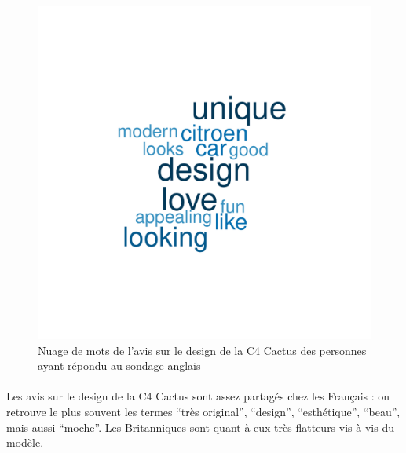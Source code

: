 \documentclass[12pt]{article}\usepackage[]{graphicx}\usepackage[]{color}
\makeatletter
\def\maxwidth{ %
  \ifdim\Gin@nat@width>\linewidth
    \linewidth
  \else
    \Gin@nat@width
  \fi
}
\newenvironment{knitrout}{}{} %
\makeatother
\begin{document}
\begin{knitrout}
\color{fgcolor}\begin{figure}[H]
\includegraphics[width=\maxwidth]{figure/design_en-1} \caption[Nuage de mots de l'avis sur le design de la C4 Cactus des personnes ayant répondu au sondage anglais]{Nuage de mots de l'avis sur le design de la C4 Cactus des personnes ayant répondu au sondage anglais}\label{fig:design en}
\end{figure}


\end{knitrout}

\paragraph{} Les avis sur le design de la C4 Cactus sont assez partagés chez
les Français : on retrouve le plus souvent les termes ``très original'',
``design'', ``esthétique'', ``beau'', mais aussi ``moche''. Les Britanniques sont
quant à eux très flatteurs vis-à-vis du modèle.
\end{document}
